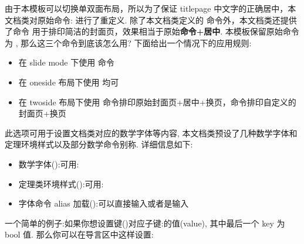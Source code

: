 \begin{remark}
由于本模板可以切换单双面布局，所以为了保证 titlepage 中文字的正确居中，本文档类对原始命令:\cmd{\maketitle} 进行了重定义.
除了本文档类定义的 \cmd{\maketitle} 命令外，本文档类还提供了命令 \cmd{\Maketitle} 用于排印简洁的封面页，效果相当于原始{\bfseries 命令+居中}.
本模板保留原始命令为 \cmd{\orimaketitle}, 那么这三个命令到底该怎么用?  下面给出一个情况下的应用规则:
\begin{itemize}
  \item 在 slide mode 下使用 \cmd{\orimaketitle} 命令
  \item 在 oneside 布局下使用 \cmd{\maketitle, \maketitle} 均可
  \item 在 twoside 布局下使用 \cmd{\Maketitle} 命令排印原始封面页+居中+换页，\cmd{\maketitle}命令排印自定义的封面页+换页
\end{itemize}
\end{remark}

此选项可用于设置文档类对应的数学字体等内容, 本文档类预设了几种数学字体和定理环境样式以及部分数学命令别称. 详细信息如下:
\begin{itemize}
    \item 数学字体():可用:
    \item 定理类环境样式():可用:
    \item 字体命令 alias 加载():可以直接输入或者是输入
\end{itemize}

一个简单的例子:如果你想设置键()对应子键:的值(value), 其中最后一个 key 为 bool 值.
那么你可以在导言区中这样设置:

